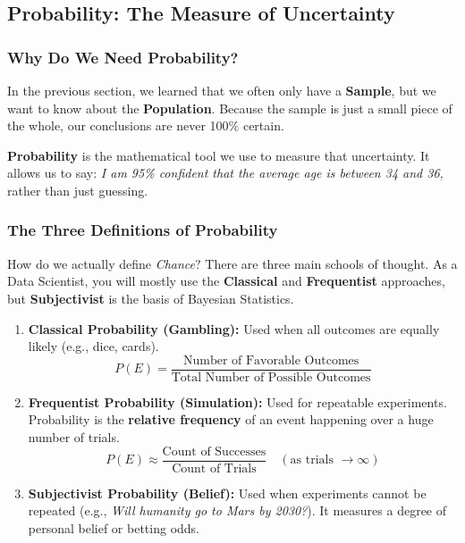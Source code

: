 \documentclass[11pt]{article}
\theoremstyle{smallexample}
\newcommand{\vs}{\vspace{0.2\baselineskip}}
\begin{document}
\subsection{Probability: The Measure of Uncertainty}

\subsubsection{Why Do We Need Probability?}

In the previous section, we learned that we often only have a \textbf{Sample}, but we want to know about the \textbf{Population}.
Because the sample is just a small piece of the whole, our conclusions are never 100\% certain.

\textbf{Probability} is the mathematical tool we use to measure that uncertainty. It allows us to say: \textit{I am 95\% confident that the average age is between 34 and 36,} rather than just guessing.

\subsubsection{The Three Definitions of Probability}

How do we actually define \textit{Chance}? There are three main schools of thought. As a Data Scientist, you will mostly use the \textbf{Classical} and \textbf{Frequentist} approaches, but \textbf{Subjectivist} is the basis of Bayesian Statistics.

\begin{enumerate}
    \item \textbf{Classical Probability (Gambling):}
    Used when all outcomes are equally likely (e.g., dice, cards).
    \[ P(E) = \frac{\text{Number of Favorable Outcomes}}{\text{Total Number of Possible Outcomes}} \]

\vs
    \item \textbf{Frequentist Probability (Simulation):}
    Used for repeatable experiments. Probability is the \textbf{relative frequency} of an event happening over a huge number of trials.
    \[ P(E) \approx \frac{\text{Count of Successes}}{\text{Count of Trials}} \quad (\text{as trials } \to \infty) \]

\vs
    \item \textbf{Subjectivist Probability (Belief):}
    Used when experiments cannot be repeated (e.g., \textit{Will humanity go to Mars by 2030?}). It measures a degree of personal belief or betting odds.
\end{enumerate}
\end{document}
